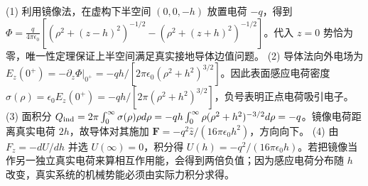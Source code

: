 (1) 利用镜像法，在虚构下半空间 \((0,0,-h)\) 放置电荷 \(-q\)，得到 \(\Phi=\frac{q}{4\pi\epsilon_0}[(\rho^2+(z-h)^2)^{-1/2}-(\rho^2+(z+h)^2)^{-1/2}]\)。代入 \(z=0\) 势恰为零，唯一性定理保证上半空间满足真实接地导体边值问题。
(2) 导体法向外电场为 \(E_z(0^+)=-\partial_z\Phi|_{0^+}=-qh/[2\pi\epsilon_0(\rho^2+h^2)^{3/2}]\)。因此表面感应电荷密度 \(\sigma(\rho)=\epsilon_0E_z(0^+)=-qh/[2\pi(\rho^2+h^2)^{3/2}]\)，负号表明正点电荷吸引电子。
(3) 面积分 \(Q_{\rm ind}=2\pi\int_0^\infty\sigma(\rho)\rho d\rho=-qh\int_0^\infty\rho(\rho^2+h^2)^{-3/2}d\rho=-q\)。镜像电荷距离真实电荷 \(2h\)，故导体对其施加 \(\mathbf F=-q^2\hat z/(16\pi\epsilon_0h^2)\)，方向向下。
(4) 由 \(F_z=-dU/dh\) 并选 \(U(\infty)=0\)，积分得 \(U(h)=-q^2/(16\pi\epsilon_0h)\)。若把镜像当作另一独立真实电荷来算相互作用能，会得到两倍负值；因为感应电荷分布随 \(h\) 改变，真实系统的机械势能必须由实际力积分求得。

